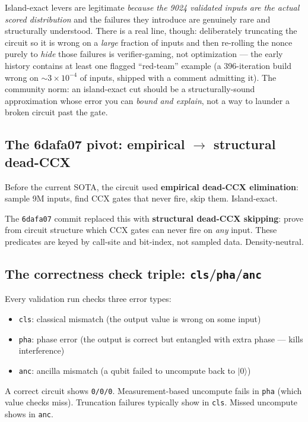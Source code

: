 \documentclass[11pt,a4paper]{article}
\newcommand{\ket}[1]{$|#1\rangle$\xspace}
\newcommand{\cls}{\texttt{cls}\xspace}
\newcommand{\pha}{\texttt{pha}\xspace}
\newcommand{\anc}{\texttt{anc}\xspace}
\begin{document}
\begin{tcolorbox}[noteboxstyle, title={The line between island-exact and cheating}]
Island-exact levers are legitimate \emph{because the 9024 validated inputs are the actual scored
distribution} and the failures they introduce are genuinely rare and structurally understood. There
is a real line, though: deliberately truncating the circuit so it is wrong on a \emph{large} fraction
of inputs and then re-rolling the nonce purely to \emph{hide} those failures is verifier-gaming, not
optimization --- the early history contains at least one flagged ``red-team'' example (a 396-iteration
build wrong on $\sim$$3\times10^{-4}$ of inputs, shipped with a comment admitting it). The community
norm: an island-exact cut should be a structurally-sound approximation whose error you can
\emph{bound and explain}, not a way to launder a broken circuit past the gate.
\end{tcolorbox}

\subsection{The 6dafa07 pivot: empirical $\to$ structural dead-CCX}

Before the current SOTA, the circuit used \textbf{empirical dead-CCX elimination}: sample 9M
inputs, find CCX gates that never fire, skip them. Island-exact.

The \texttt{6dafa07} commit replaced this with \textbf{structural dead-CCX skipping}: prove from
circuit structure which CCX gates can never fire on \emph{any} input. These predicates are keyed
by call-site and bit-index, not sampled data. Density-neutral.

\subsection{The correctness check triple: \cls/\pha/\anc}

Every validation run checks three error types:
\begin{itemize}
  \item \cls: classical mismatch (the output value is wrong on some input)
  \item \pha: phase error (the output is correct but entangled with extra phase --- kills interference)
  \item \anc: ancilla mismatch (a qubit failed to uncompute back to \ket{0})
\end{itemize}

A correct circuit shows \texttt{0/0/0}. Measurement-based uncompute fails in \pha{} (which value
checks miss). Truncation failures typically show in \cls. Missed uncompute shows in \anc.
\end{document}
